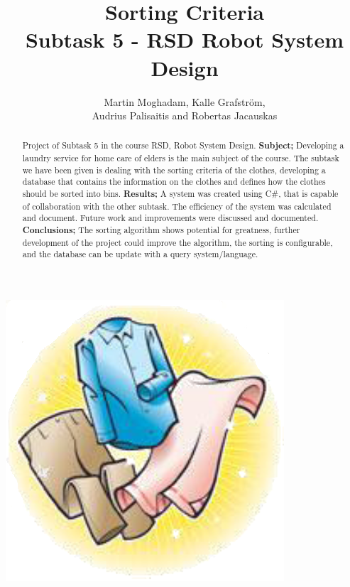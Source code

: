 \documentclass[a4paper, 11pt]{article}	%
\begin{document}
\begin{titlepage}
\title{\Huge \bfseries Sorting Criteria \vspace{3 mm}\\ \Large \normalfont Subtask 5 - RSD Robot System Design\vspace{10mm}}   %
\author{Martin Moghadam, Kalle Grafstr\"{o}m, \\ Audrius Palisaitis and Robertas Jacauskas}         %
\maketitle

\begin{center}
\includegraphics[scale=0.4]{frontPage}
\end{center}

\begin{abstract}
\noindent Project of Subtask 5 in the course RSD, Robot System Design. \textbf{Subject;} Developing a laundry service for home care of elders is the main subject of the course. The subtask we have been given is dealing with the sorting criteria of the clothes, developing a database that contains the information on the clothes and defines how the clothes should be sorted into bins. \textbf{Results;} A system was created using C\#, that is capable of collaboration with the other subtask. The efficiency of the system was calculated and document. Future work and improvements were discussed and documented. \textbf{Conclusions;} The sorting algorithm shows potential for greatness, further development of the project could improve the algorithm, the sorting is configurable, and the database can be update with a query system/language.
\end{abstract}

\end{titlepage}
\end{document}
